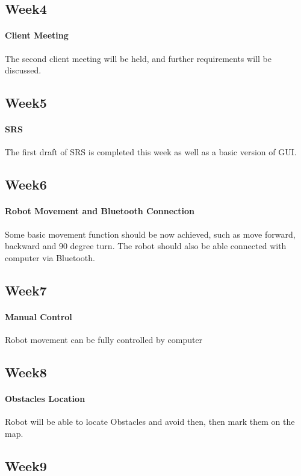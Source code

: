 \documentclass[11pt, a4paper]{report}
\begin{document}
\subsection{Week4}
\paragraph{Client Meeting}
The second client meeting will be held, and further requirements will be discussed. 

\subsection{Week5}
\paragraph{SRS}
The first draft of SRS is completed this week as well as a basic version of GUI.


\subsection{Week6}
\paragraph{Robot Movement and Bluetooth Connection}
Some basic movement function should be now achieved, such as move forward, backward and 90 degree turn. The robot should also be able connected with computer via Bluetooth.

\subsection{Week7}
\paragraph{Manual Control}
Robot movement can be fully controlled by computer 


\subsection{Week8}
\paragraph{Obstacles Location}
Robot will be able to locate Obstacles and avoid then, then mark them on the map.


\subsection{Week9}
\end{document}
